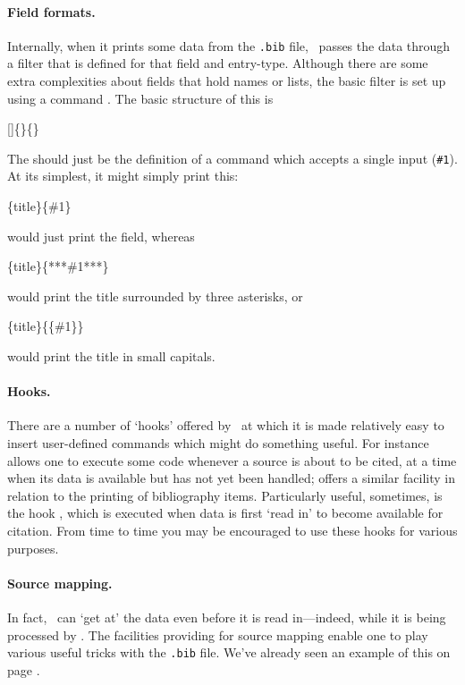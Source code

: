 \paragraph{Field formats.} Internally, when it prints some data from
the \verb|.bib| file, \biblatex\ passes the data through a filter that
is defined for that field and entry-type. Although there are some
extra complexities about fields that hold names or lists, the basic
filter is set up using a command . The basic
structure of this is
\begin{pseudoverb}
[]\{\}\{\}
\end{pseudoverb}
The  should just be the definition of a command which
accepts a single input (\texttt{\#1}). At its simplest, it
might simply print this:
\begin{pseudoverb}
\{title\}\{\#1\}
\end{pseudoverb}
would just print the field, whereas
\begin{pseudoverb}
\{title\}\{***\#1***\}
\end{pseudoverb}
would print the title surrounded by three asterisks, or
\begin{pseudoverb}
\{title\}\{\{\#1\}\}
\end{pseudoverb}
would print the title in small capitals.

\paragraph{Hooks.} There are a number
of `hooks' offered by \biblatex\ at which it is made relatively easy
to insert user-defined commands which might do something useful. For
instance  allows one to execute some code whenever
a source is about to be cited, at a time when its data is available
but has not yet been handled;  offers a similar
facility in relation to the printing of bibliography
items. Particularly useful, sometimes, is the hook ,
which is executed when data is first `read in' to become available for
citation. From time to time you may be encouraged to use these hooks
for various purposes.

\paragraph{Source mapping.} In fact,
\biblatex\ can `get at' the data even before it is read in---indeed,
while it is being processed by . The facilities
providing for source mapping enable one to play various useful tricks
with the \verb|.bib| file. We've already seen an example of this on
page \pageref{datamap}.

